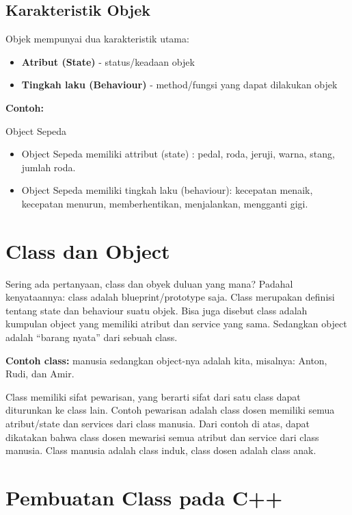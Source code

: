 \subsection{Karakteristik Objek}

Objek mempunyai dua karakteristik utama:
\begin{itemize}
\item \textbf{Atribut (State)} - status/keadaan objek
\item \textbf{Tingkah laku (Behaviour)} - method/fungsi yang dapat dilakukan objek
\end{itemize}

\textbf{Contoh:}

Object Sepeda

\begin{itemize}

\item
 Object Sepeda memiliki attribut (state) : pedal, roda, jeruji, warna,
 stang, jumlah roda.
\item
 Object Sepeda memiliki tingkah laku (behaviour): kecepatan menaik,
 kecepatan menurun, memberhentikan, menjalankan, mengganti gigi.
\end{itemize}

\section{Class dan Object}\label{class-dan-object-1}

Sering ada pertanyaan, class dan obyek duluan yang mana? Padahal
kenyataannya: class adalah blueprint/prototype saja. Class merupakan
definisi tentang state dan behaviour suatu objek. Bisa juga disebut
class adalah kumpulan object yang memiliki atribut dan service yang
sama. Sedangkan object adalah ``barang nyata'' dari sebuah class.

\textbf{Contoh class:} manusia sedangkan object-nya adalah kita, misalnya: Anton,
Rudi, dan Amir.

Class memiliki sifat pewarisan, yang berarti sifat dari satu class dapat
diturunkan ke class lain. Contoh pewarisan adalah class dosen memiliki
semua atribut/state dan services dari class manusia. Dari contoh di
atas, dapat dikatakan bahwa class dosen mewarisi semua atribut dan
service dari class manusia. Class manusia adalah class induk, class
dosen adalah class anak.

\section{Pembuatan Class pada C++}\label{pembuatan-class-pada-c}

